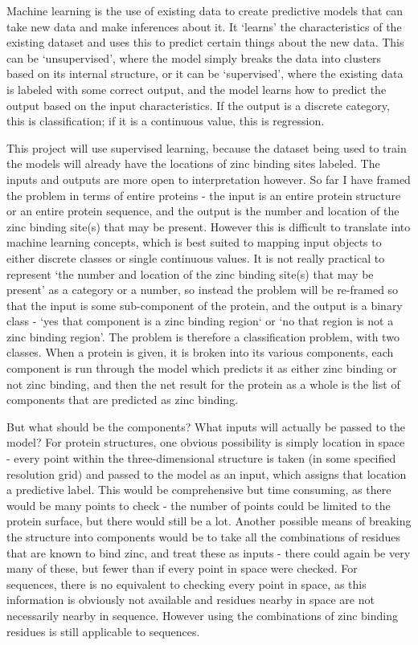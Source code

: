 Machine learning is the use of existing data to create predictive models that can take new data and make inferences about it. It `learns' the characteristics of the existing dataset and uses this to predict certain things about the new data. This can be `unsupervised', where the model simply breaks the data into clusters based on its internal structure, or it can be `supervised', where the existing data is labeled with some correct output, and the model learns how to predict the output based on the input characteristics. If the output is a discrete category, this is classification; if it is a continuous value, this is regression.

This project will use supervised learning, because the dataset being used to train the models will already have the locations of zinc binding sites labeled. The inputs and outputs are more open to interpretation however. So far I have framed the problem in terms of entire proteins - the input is an entire protein structure or an entire protein sequence, and the output is the number and location of the zinc binding site(s) that may be present. However this is difficult to translate into machine learning concepts, which is best suited to mapping input objects to either discrete classes or single continuous values. It is not really practical to represent `the number and location of the zinc binding site(s) that may be present' as a category or a number, so instead the problem will be re-framed so that the input is some sub-component of the protein, and the output is a binary class - `yes that component is a zinc binding region` or `no that region is not a zinc binding region'. The problem is therefore a classification problem, with two classes. When a protein is given, it is broken into its various components, each component is run through the model which predicts it as either zinc binding or not zinc binding, and then the net result for the protein as a whole is the list of components that are predicted as zinc binding.

But what should be the components? What inputs will actually be passed to the model? For protein structures, one obvious possibility is simply location in space - every point within the three-dimensional structure is taken (in some specified resolution grid) and passed to the model as an input, which assigns that location a predictive label. This would be comprehensive but time consuming, as there would be many points to check - the number of points could be limited to the protein surface, but there would still be a lot. Another possible means of breaking the structure into components would be to take all the combinations of residues that are known to bind zinc, and treat these as inputs - there could again be very many of these, but fewer than if every point in space were checked. For sequences, there is no equivalent to checking every point in space, as this information is obviously not available and residues nearby in space are not necessarily nearby in sequence. However using the combinations of zinc binding residues is still applicable to sequences.

